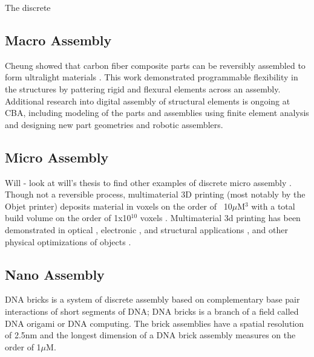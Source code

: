 {The discrete 

\subsection{Macro Assembly}

Cheung showed that carbon fiber composite parts can be reversibly assembled to form ultralight materials \cite{Cheung2013}.  This work demonstrated programmable flexibility in the structures by pattering rigid and flexural elements across an assembly.  Additional research into digital assembly of structural elements is ongoing at CBA, including modeling of the parts and assemblies using finite element analysis\cite{Calisch2014} and designing new part geometries and robotic assemblers\cite{Carney2015}.

\subsection{Micro Assembly}


Will - look at will's thesis to find other examples of discrete micro assembly \cite{Langford2014}.
\\

Though not a reversible process, multimaterial 3D printing (most notably by the Objet printer) deposits material in voxels on the order of ~10$\mu$M$^{3}$ with a total build volume on the order of 1x10$^{10}$ voxels \cite{Objet1000}.  Multimaterial 3d printing has been demonstrated in optical \cite{Willis2012}, electronic \cite{Ahn2009}, and structural applications \cite{Skouras2013} \cite{Schumacher}, and other physical optimizations of objects \cite{Bacher2014}.

\subsection{Nano Assembly}

DNA bricks is a system of discrete assembly based on complementary base pair interactions of short segments of DNA\cite{Ke2012}; DNA bricks is a branch of a  field called DNA origami\cite{Rothemund2006} or DNA computing.  The brick assemblies have a spatial resolution of 2.5nm and the longest dimension of a DNA brick assembly measures on the order of 1$\mu$M\cite{Ke2014}.
\\

}
